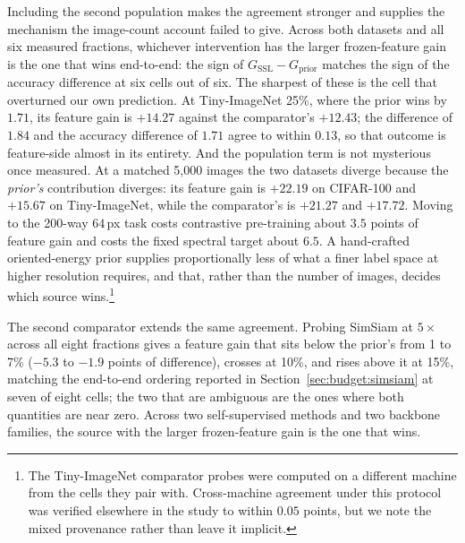Including the second population makes the agreement stronger and supplies
the mechanism the image-count account failed to give. Across both datasets
and all six measured fractions, whichever intervention has the larger
frozen-feature gain is the one that wins end-to-end: the sign of
$G_{\mathrm{SSL}} - G_{\mathrm{prior}}$ matches the sign of the accuracy
difference at six cells out of six. The sharpest of these is the cell that
overturned our own prediction. At Tiny-ImageNet 25\%, where the prior wins
by $1.71$, its feature gain is $+14.27$ against the comparator's $+12.43$;
the difference of $1.84$ and the accuracy difference of $1.71$ agree to
within $0.13$, so that outcome is feature-side almost in its entirety. And the population term is not mysterious once measured.
At a matched 5{,}000 images the two datasets diverge because the
\emph{prior's} contribution diverges: its feature gain is $+22.19$ on
CIFAR-100 and $+15.67$ on Tiny-ImageNet, while the comparator's is $+21.27$
and $+17.72$. Moving to the 200-way $64$\,px task costs contrastive
pre-training about $3.5$ points of feature gain and costs the fixed spectral
target about $6.5$. A hand-crafted oriented-energy prior supplies
proportionally less of what a finer label space at higher resolution
requires, and that, rather than the number of images, decides which source
wins.\footnote{The Tiny-ImageNet comparator probes were computed on a
different machine from the cells they pair with. Cross-machine agreement
under this protocol was verified elsewhere in the study to within $0.05$
points, but we note the mixed provenance rather than leave it implicit.}

The second comparator extends the same agreement. Probing SimSiam at
$5\times$ across all eight fractions gives a feature gain that sits below
the prior's from 1 to 7\% ($-5.3$ to $-1.9$ points of difference), crosses
at 10\%, and rises above it at 15\%, matching the end-to-end ordering
reported in Section~\ref{sec:budget:simsiam} at seven of eight cells; the
two that are ambiguous are the ones where both quantities are near zero.
Across two self-supervised methods and two backbone families, the source
with the larger frozen-feature gain is the one that wins.

